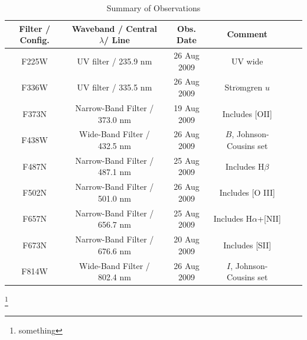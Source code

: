 \begin{table}[h]
  \centering
  \begin{tabular}{ c c c c c c }
    \hline\hline
    Filter / Config. & Waveband / Central $\lambda$/ Line & Obs. Date & Comment \\
    \hline
    F225W & UV filter / 235.9 nm & 26 Aug 2009 &  UV wide\\
    
    F336W & UV filter / 335.5 nm & 26 Aug 2009 & Str$\ddot{o}$mgren $u$\\
    
    F373N & Narrow-Band Filter / 373.0 nm & 19 Aug 2009 & Includes \textsc{[OII]}\\
    
    F438W & Wide-Band Filter / 432.5 nm & 26 Aug 2009 & $B$, Johnson-Cousins set\\
    
    F487N & Narrow-Band Filter / 487.1 nm & 25 Aug 2009 & Includes H$\beta$\\
    
    F502N & Narrow-Band Filter / 501.0 nm & 26 Aug 2009 & Includes \textsc{[O III]}\\
    
    F657N & Narrow-Band Filter / 656.7 nm & 25 Aug 2009 & Includes H$\alpha$+\textsc{[NII]}\\
    
    F673N & Narrow-Band Filter / 676.6 nm & 20 Aug 2009 & Includes \textsc{[SII]}\\
    
    F814W & Wide-Band Filter / 802.4 nm & 26 Aug 2009 & $I$, Johnson-Cousins set\\
    \hline
  \end{tabular}
  \caption{Summary of Observations}
  \label{tab:uno}
\end{table}

\footnote{something}